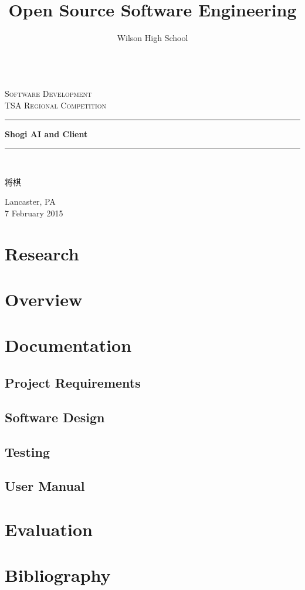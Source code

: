 \documentclass[letterpaper,12pt]{article}
\title{Open Source Software Engineering}
\author{Wilson High School}
\begin{document}
\begin{titlepage}
\begin{center}
 ~\\[1cm]
 \textsc{\LARGE Software Development}\\[1.5cm]
 \textsc{\Large TSA Regional Competition}\\[0.5cm]
 \rule{\linewidth}{0.5mm}
 {\huge \bfseries Shogi AI and Client \\[0.4cm]}
 \rule{\linewidth}{0.5mm}\\[0.5cm]
 \begin{CJK}{UTF8}{gbsn}
 {\huge 将棋}
 \end{CJK}
 \vfill
 {\large Lancaster, PA \\[0.4cm]}
 {\large 7 February 2015}
\end{center}
\end{titlepage}

\tableofcontents

\pagebreak

\section{Research}

\section{Overview}

\section{Documentation}

\subsection{Project Requirements}

\subsection{Software Design}

\subsection{Testing}

\subsection{User Manual}

\section{Evaluation}

\section{Bibliography}
\end{document}
